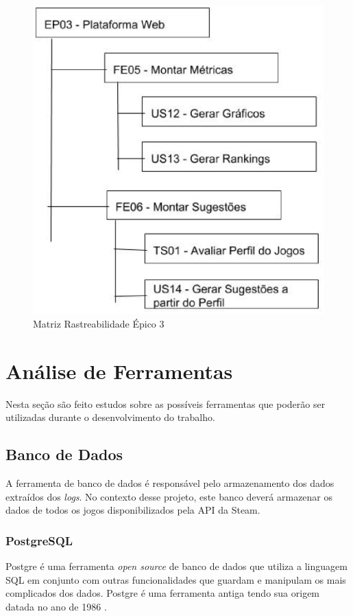 \begin{figure}
\centering
\includegraphics[scale=0.35]{figuras/EP03.eps}
\caption{Matriz Rastreabilidade Épico 3}
\label{image:ep03}
\end{figure}
\section{Análise de Ferramentas}
Nesta seção são feito estudos sobre as possíveis ferramentas que poderão ser utilizadas durante o desenvolvimento do trabalho.
\subsection{Banco de Dados}
A ferramenta de banco de dados é responsável pelo armazenamento dos dados extraídos dos \textit{logs}. No contexto desse projeto, este banco deverá armazenar os dados de todos os jogos disponibilizados pela API da Steam.
\subsubsection*{PostgreSQL}
Postgre é uma ferramenta \textit{open source} de banco de dados que utiliza a linguagem SQL em conjunto com outras funcionalidades que guardam e manipulam os mais complicados dos dados. Postgre é uma ferramenta antiga tendo sua origem datada no ano de 1986 \cite{postgresql}.

